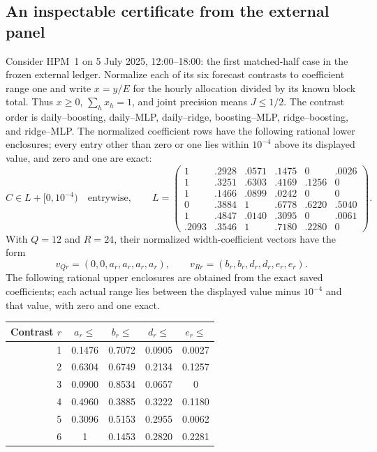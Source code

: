 \subsection{An inspectable certificate from the external panel}
\label{sec:worked-joint-certificate}
Consider HPM~1 on 5 July 2025, 12:00--18:00: the first matched-half case
in the frozen external ledger.  Normalize each of its six forecast
contrasts to coefficient range one and write $x=y/E$ for the hourly
allocation divided by its known block total. Thus $x\geq0$, $\sum_hx_h=1$,
and joint precision means $J\leq1/2$. The contrast order is
daily--boosting, daily--MLP, daily--ridge, boosting--MLP,
ridge--boosting, and ridge--MLP.  The normalized coefficient rows have
the following rational lower enclosures; every entry other than zero
or one lies within $10^{-4}$ above its displayed value, and zero and one
are exact:
\[
 C\in L+[0,10^{-4})\quad\text{entrywise},\qquad
 L=\begin{pmatrix}
 1&.2928&.0571&.1475&0&.0026\\
 1&.3251&.6303&.4169&.1256&0\\
 1&.1466&.0899&.0242&0&0\\
 0&.3884&1&.6778&.6220&.5040\\
 1&.4847&.0140&.3095&0&.0061\\
 .2093&.3546&1&.7180&.2280&0
 \end{pmatrix}.
\]
With $Q=12$ and $R=24$, their normalized width-coefficient
vectors have the form
\[
 v_{Qr}=(0,0,a_r,a_r,a_r,a_r),\qquad
 v_{Rr}=(b_r,b_r,d_r,d_r,e_r,e_r).
\]
The following rational upper enclosures are obtained from the exact saved
coefficients; each actual range lies between the displayed value minus
$10^{-4}$ and that value, with zero and one exact.
\begin{center}
\setlength{\tabcolsep}{8pt}
\begin{tabular}{rcccc}
\toprule
Contrast $r$&$a_r\leq$&$b_r\leq$&$d_r\leq$&$e_r\leq$\\
\midrule
1&0.1476&0.7072&0.0905&0.0027\\
2&0.6304&0.6749&0.2134&0.1257\\
3&0.0900&0.8534&0.0657&0\\
4&0.4960&0.3885&0.3222&0.1180\\
5&0.3096&0.5153&0.2955&0.0062\\
6&1&0.1453&0.2820&0.2281\\
\bottomrule
\end{tabular}
\end{center}

